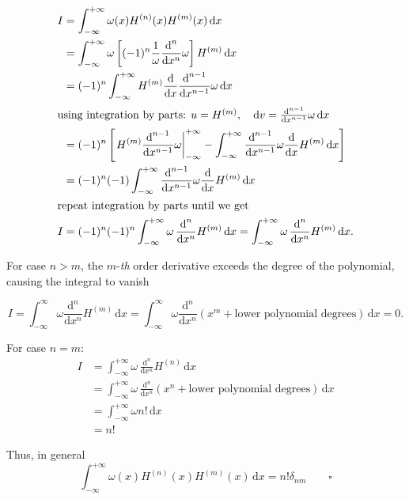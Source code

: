 \documentclass[draft]{article}
\begin{document}
\begin{align*}
	I &= \int_{-\infty}^{+\infty} \omega(x) H^{(n)} (x) H^{(m)} (x) \, \text{d}x \\
	  &= \int_{-\infty}^{+\infty} \omega \left [ (-1)^{n} \frac{1}{\omega} \frac{\text{d}^n}{\text{d}x^n} \omega \right ] H^{(m)} \, \text{d}x \\
	  &=(-1)^n \int_{-\infty}^{+\infty} H^{(m)} \frac{\text{d}}{\text{d}x}\frac{\text{d}^{n-1}}{\text{d}x^{n-1}} \omega \, \text{d}x \\
\intertext{using integration by parts: $u = H^{(m)}, \quad \text{d}v = \frac{\text{d}^{n-1}}{\text{d}x^{n-1}}\omega \, \text{d}x$}
	  &= (-1)^n \left [ \left . H^{(m)} \frac{\text{d}^{n-1}}{\text{d}x^{n-1}}\omega \right |_{-\infty}^{+\infty} - \int_{-\infty}^{+\infty} \frac{\text{d}^{n-1}}{\text{d}x^{n-1}}\omega \frac{\text{d}}{\text{d}x} H^{(m)} \, \text{d}x \right ] \\
	  &= (-1)^n (-1) \int_{-\infty}^{+\infty} \frac{\text{d}^{n-1}}{\text{d}x^{n-1}}\omega \frac{\text{d}}{\text{d}x} H^{(m)} \, \text{d}x \\
\intertext{repeat integration by parts until we get}
    I &= (-1)^n (-1)^n \int_{-\infty}^{+\infty} \omega \, \frac{\text{d}^n}{\text{d}x^n} H^{(m)} \, \text{d}x = \int_{-\infty}^{+\infty} \omega \, \frac{\text{d}^n}{\text{d}x^n} H^{(m)} \, \text{d}x.
\end{align*}
\clearpage


For case $n > m$, the $m$-\textit{th} order derivative exceeds the degree of the polynomial, causing the integral to vanish

$$
I = \int_{-\infty}^{\infty} \omega \frac{\text{d}^n}{\text{d}x^n} H^{(m)} \, \text{d}x = \int_{-\infty}^{\infty} \omega \frac{\text{d}^n}{\text{d}x^n} (x^m + \text{lower polynomial degrees}) \, \text{d}x = 0.
$$

For case $n = m$:
\begin{align*}
	I &= \int_{-\infty}^{+\infty} \omega \, \frac{\text{d}^n}{\text{d}x^n} H^{(n)} \, \text{d}x \\
	  &= \int_{-\infty}^{+\infty} \omega \, \frac{\text{d}^n}{\text{d}x^n} (x^n + \text{lower polynomial degrees}) \, \text{d}x \\
	  &= \int_{-\infty}^{+\infty} \omega n! \, \text{d}x \\
	  &= n!
\end{align*}

Thus, in general
$$
\int_{-\infty}^{+\infty} \omega(x) H^{(n)} (x) H^{(m)} (x) \, \text{d}x = n! \delta_{nm} \qquad \square
$$
\end{document}
